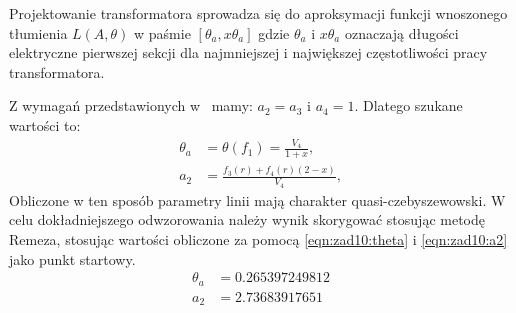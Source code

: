 \documentclass[rep.tex]{subfiles}
\begin{document}
Projektowanie transformatora sprowadza się do aproksymacji funkcji wnoszonego tłumienia $L(A, \theta)$ w paśmie $[\theta_a, x\theta_a]$ gdzie $\theta_a$ i $x\theta_a$ oznaczają długości elektryczne pierwszej sekcji dla najmniejszej i największej częstotliwości pracy transformatora.

Z wymagań przedstawionych w~\cite{obwody} mamy: $a_2 = a_3$ i $a_4 = 1$.
Dlatego szukane wartości to:
\begin{align}
  \theta_a &= \theta(f_1) = \frac{V_4}{1 + x}, \label{eqn:zad10:theta} \\
  a_2 &= \frac{f_3(r) + f_4(r)(2 - x)}{V_4}, \label{eqn:zad10:a2}
\end{align}
Obliczone w ten sposób parametry linii mają charakter quasi-czebyszewowski.
W celu dokładniejszego odwzorowania należy wynik skorygować stosując metodę Remeza, stosując wartości obliczone za pomocą \ref{eqn:zad10:theta} i \ref{eqn:zad10:a2} jako punkt startowy.
\begin{align}
  \theta_a &= 0.265397249812 \nonumber \\
  a_2 &= 2.73683917651 \nonumber \\
\end{align}
\end{document}
